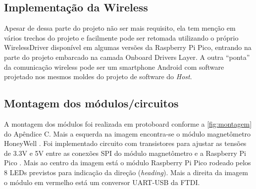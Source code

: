 \documentclass[10pt,twocolumn,letterpaper]{article}
\begin{document}
\subsection[short]{Implementação da Wireless}
Apesar de dessa parte do projeto não ser mais requisito, ela tem menção em vários trechos do projeto e facilmente pode ser retomada utilizando o próprio WirelessDriver disponível em algumas versões da Raspberry Pi Pico, entrando na parte do projeto embarcado na camada Onboard Drivers Layer.
A outra ``ponta'' da comunicação wireless pode ser um smartphone Android com software projetado nos mesmos moldes do projeto de software do \emph{Host}.
\subsection[short]{Montagem dos módulos/circuitos}
A montagem dos módulos foi realizada em protoboard conforme a \autoref{fig:montagem} do Apêndice C. Mais a esquerda na imagem encontra-se o módulo magnetômetro HoneyWell \cite{HMR3300_Datasheet}. 
Foi implementado circuito com transistores para ajustar as tensões de 3.3V e 5V entre as conexões SPI do módulo magnetômetro \cite{HMR3300_Datasheet} e a Raspberry Pi Pico \cite{RP2040_Datasheet}.
Mais ao centro da imagem está o módulo Raspberry Pi Pico \cite{RP2040_Datasheet} rodeado pelos 8 LEDs previstos para indicação da direção (\emph{heading}).
Mais a direita da imagem o módulo em vermelho está um conversor UART-USB da FTDI. 
\end{document}
